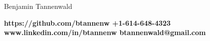 \documentclass[line]{letter}
\begin{document}
{\bf \begin{center}\LARGE Benjamin Tannenwald\end{center}}%
{\bf \normalsize https://github.com/btannenw \hfill +1-614-648-4323\\} 
{\bf \normalsize www.linkedin.com/in/btannenw \hfill btannenwald@gmail.com\vspace*{-.15in}}

\noindent{\rule{\textwidth}{1.5pt}}

\end{document}
